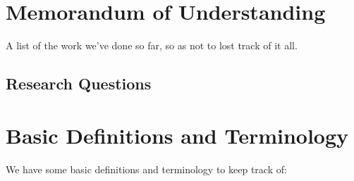 \documentclass{article}
\begin{document}
\section{Memorandum of Understanding}

A list of the work we've done so far, so as not to lost track of it all.

\subsection{Research Questions}


\bigskip

\section{Basic Definitions and Terminology}

We have some basic definitions and terminology to keep track of:
\end{document}
